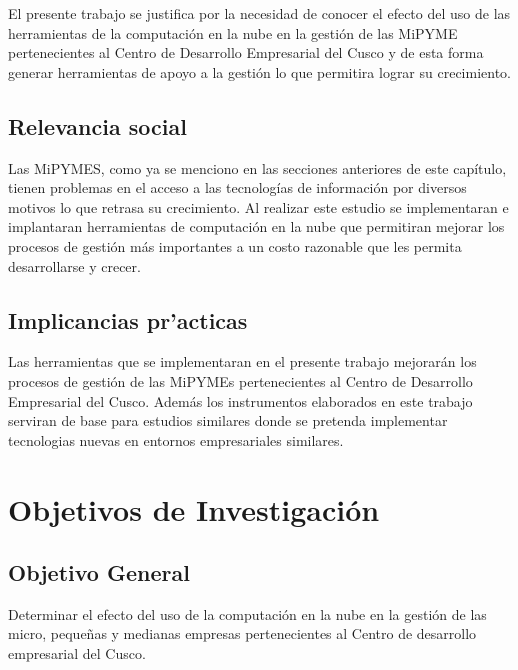 El presente trabajo se justifica por la necesidad de conocer el efecto del uso
de las herramientas de la computación en la nube en la gestión de las MiPYME
pertenecientes al Centro de Desarrollo Empresarial del Cusco y de esta forma
generar herramientas de apoyo a la gestión lo que permitira lograr su crecimiento.


\subsection{Relevancia social}
Las MiPYMES, como ya se menciono en las secciones anteriores de este capítulo,
tienen problemas en el acceso a las tecnologías de información por diversos motivos
lo que retrasa su crecimiento. Al realizar este estudio se implementaran e implantaran
herramientas de computación en la nube que permitiran mejorar los procesos de gestión
más importantes a un costo razonable que les permita desarrollarse y crecer.

\subsection{Implicancias pr'acticas}
Las herramientas que se implementaran en el presente trabajo mejorarán los procesos
de gestión de las MiPYMEs pertenecientes al Centro de Desarrollo Empresarial del Cusco.
Además los instrumentos elaborados en este trabajo serviran de base para estudios
similares donde se pretenda implementar tecnologias nuevas en entornos empresariales
similares.


\section{Objetivos de Investigación}
\subsection{Objetivo General}
Determinar el efecto del uso de la computación en la nube en la gestión de
las micro, pequeñas y medianas empresas pertenecientes al Centro de desarrollo
empresarial del Cusco.
